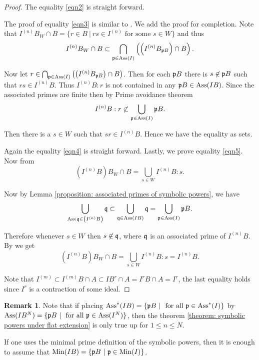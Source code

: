 \documentclass[12pt]{amsart}
\numberwithin{equation}{section}
\theoremstyle{definition}
\newtheorem{remark}[theorem]{Remark}
\DeclareMathOperator{\Ass}{Ass}
\DeclareMathOperator{\Min}{Min}
\def\pp{{\frak p}}
\def\qq{{\frak q}}
\begin{document}
\begin{proof}
The equality \ref{eqn2} is straight forward.

The proof of equality \ref{eqn3} is similar to \cite[Remark 2.8]{grifo2021symbolic}. We add the proof for completion. Note that 
$I^{(n)}B_W\cap B=\{ r \in B ~|~ rs\in I^{(n)} \text{ for some } s\in W \}$ and thus 
\begin{align*}
\displaystyle I^{(n)}B_W\cap B \subset \bigcap_{\pp \in \Ass(I)}\left( \left( I^{(n)}B_{\pp B} \right) \cap B \right).
\end{align*}

Now let $r \in \bigcap_{\pp \in \Ass(I)}\left( \left( I^{(n)}B_{\pp B} \right) \cap B \right) $. Then for each $\pp B$ there is $s\not\in \pp B$ such that $rs\in I^{(n)}B$. Thus $I^{(n)}B:r $ is not contained in any $\pp B \in \Ass(IB)$. Since the associated primes are finite then by Prime avoidance theorem $$I^{(n)}B:r \not \subset \bigcup_{\pp \in \Ass(I)} \pp B .$$ 

Then there is a $s \in W$ such that $sr \in I^{(n)}B$. Hence we have the equality as sets.

Again the equality \ref{eqn4} is straight forward. Lastly, we prove equality \ref{eqn5}. 
Now from \cite[Proposition 3.11(ii)]{atiyah1994introduction} $$(I^{(n)}B)B_W\cap B =\bigcup_{s\in W} I^{(n)}B : s .  $$

Now by Lemma \ref{proposition: associated primes of symbolic powers}, we have
\begin{align*}
\displaystyle \bigcup_{\Ass \qq \in\left( I^{(n)}B  \right)} \qq \subset\bigcup_{\qq\in \Ass (IB)}\qq=\bigcup_{\pp \in \Ass(I)}\pp B.
\end{align*}

Therefore whenever $s\in W$ then $s \not \in \qq$, where $\qq$ is an associated prime of $I^{(n)}B$. By \cite[Proposition 4.4(iii)]{atiyah1994introduction} we get 
   $$(I^{(n)}B)B_W\cap B =\bigcup_{s\in W} I^{(n)}B : s =I^{(n)}B.   $$
   
Note that $I^{(m)} \subset I^{(m)}B \cap A \subset IB^r \cap A=I^rB\cap A =I^r$, the last equality holds since $I^r$ is a contraction of some ideal. 
	\end{proof}
	
\begin{remark} Note that if placing $\Ass^*(IB)=\{\pp B~|~ \text{ for all } \pp\in \Ass^*(I) \}$ by $\Ass(IB^N)=\{\pp B~|~ \text{ for all } \pp\in \Ass(I^N) \}$, then the theorem \ref{theorem: symbolic powers under flat extension} is only true up for $ 1 \leqslant n \leqslant N$.

If one uses the minimal prime definition of the symbolic powers, then it is enough to assume that 
 $\Min(IB)=\{\pp B ~|~ \pp \in \Min (I) \}$.   
 \end{remark}
 
\end{document}
